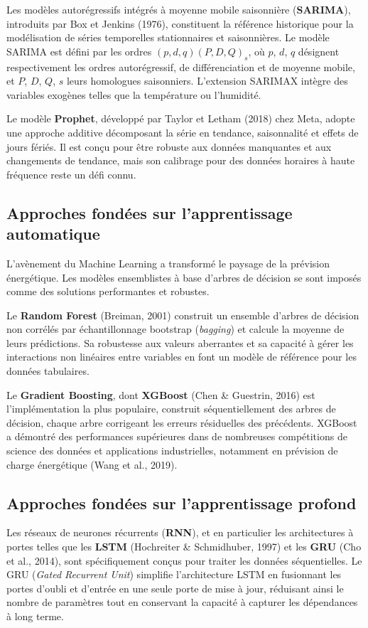 \documentclass[12pt,a4paper]{article}
\begin{document}
Les modèles autorégressifs intégrés à moyenne mobile saisonnière (\textbf{SARIMA}), introduits par Box et Jenkins (1976), constituent la référence historique pour la modélisation de séries temporelles stationnaires et saisonnières. Le modèle SARIMA est défini par les ordres $(p, d, q)(P, D, Q)_s$, où $p$, $d$, $q$ désignent respectivement les ordres autorégressif, de différenciation et de moyenne mobile, et $P$, $D$, $Q$, $s$ leurs homologues saisonniers. L'extension SARIMAX intègre des variables exogènes telles que la température ou l'humidité.

Le modèle \textbf{Prophet}, développé par Taylor et Letham (2018) chez Meta, adopte une approche additive décomposant la série en tendance, saisonnalité et effets de jours fériés. Il est conçu pour être robuste aux données manquantes et aux changements de tendance, mais son calibrage pour des données horaires à haute fréquence reste un défi connu.

\subsection{Approches fondées sur l'apprentissage automatique}
L'avènement du Machine Learning a transformé le paysage de la prévision énergétique. Les modèles ensemblistes à base d'arbres de décision se sont imposés comme des solutions performantes et robustes.

Le \textbf{Random Forest} (Breiman, 2001) construit un ensemble d'arbres de décision non corrélés par échantillonnage bootstrap (\textit{bagging}) et calcule la moyenne de leurs prédictions. Sa robustesse aux valeurs aberrantes et sa capacité à gérer les interactions non linéaires entre variables en font un modèle de référence pour les données tabulaires.

Le \textbf{Gradient Boosting}, dont \textbf{XGBoost} (Chen \& Guestrin, 2016) est l'implémentation la plus populaire, construit séquentiellement des arbres de décision, chaque arbre corrigeant les erreurs résiduelles des précédents. XGBoost a démontré des performances supérieures dans de nombreuses compétitions de science des données et applications industrielles, notamment en prévision de charge énergétique (Wang et al., 2019).

\subsection{Approches fondées sur l'apprentissage profond}
Les réseaux de neurones récurrents (\textbf{RNN}), et en particulier les architectures à portes telles que les \textbf{LSTM} (Hochreiter \& Schmidhuber, 1997) et les \textbf{GRU} (Cho et al., 2014), sont spécifiquement conçus pour traiter les données séquentielles. Le GRU (\textit{Gated Recurrent Unit}) simplifie l'architecture LSTM en fusionnant les portes d'oubli et d'entrée en une seule porte de mise à jour, réduisant ainsi le nombre de paramètres tout en conservant la capacité à capturer les dépendances à long terme.
\end{document}
